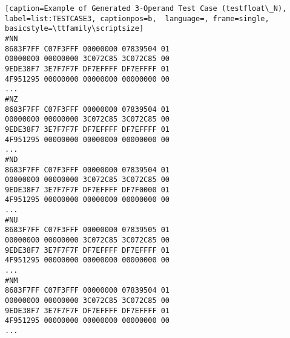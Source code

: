 \begin{description}
\begin{lstlisting}[caption=Example of Generated 3-Operand Test Case (testfloat\_N), label=list:TESTCASE3, captionpos=b,  language=, frame=single, basicstyle=\ttfamily\scriptsize]
#NN
8683F7FF C07F3FFF 00000000 07839504 01
00000000 00000000 3C072C85 3C072C85 00
9EDE38F7 3E7F7F7F DF7EFFFF DF7EFFFF 01
4F951295 00000000 00000000 00000000 00
...
#NZ
8683F7FF C07F3FFF 00000000 07839504 01
00000000 00000000 3C072C85 3C072C85 00
9EDE38F7 3E7F7F7F DF7EFFFF DF7EFFFF 01
4F951295 00000000 00000000 00000000 00
...
#ND
8683F7FF C07F3FFF 00000000 07839504 01
00000000 00000000 3C072C85 3C072C85 00
9EDE38F7 3E7F7F7F DF7EFFFF DF7F0000 01
4F951295 00000000 00000000 00000000 00
...
#NU
8683F7FF C07F3FFF 00000000 07839505 01
00000000 00000000 3C072C85 3C072C85 00
9EDE38F7 3E7F7F7F DF7EFFFF DF7EFFFF 01
4F951295 00000000 00000000 00000000 00
...
#NM
8683F7FF C07F3FFF 00000000 07839504 01
00000000 00000000 3C072C85 3C072C85 00
9EDE38F7 3E7F7F7F DF7EFFFF DF7EFFFF 01
4F951295 00000000 00000000 00000000 00
...
\end{lstlisting}



\end{description}
